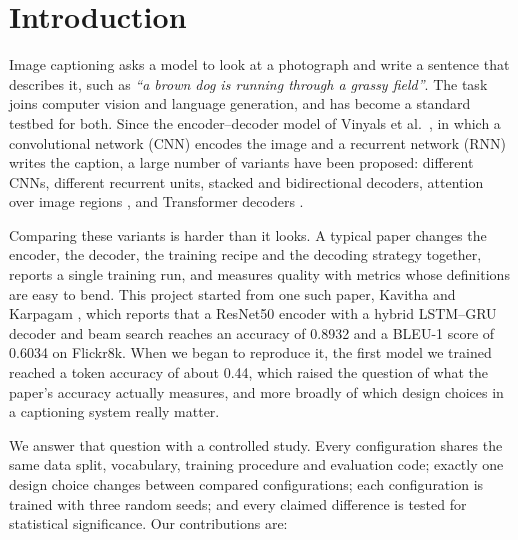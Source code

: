 \documentclass[11pt]{article}
\begin{document}
\section{Introduction}

Image captioning asks a model to look at a photograph and write a sentence that describes it, such as \textit{``a brown dog is running through a grassy field''}. The task joins computer vision and language generation, and has become a standard testbed for both. Since the encoder--decoder model of Vinyals et al.\ \cite{vinyals2015}, in which a convolutional network (CNN) encodes the image and a recurrent network (RNN) writes the caption, a large number of variants have been proposed: different CNNs, different recurrent units, stacked and bidirectional decoders, attention over image regions \cite{xu2015,anderson2018}, and Transformer decoders \cite{vaswani2017}.

Comparing these variants is harder than it looks. A typical paper changes the encoder, the decoder, the training recipe and the decoding strategy together, reports a single training run, and measures quality with metrics whose definitions are easy to bend. This project started from one such paper, Kavitha and Karpagam \cite{kavitha2025}, which reports that a ResNet50 encoder with a hybrid LSTM--GRU decoder and beam search reaches an accuracy of 0.8932 and a BLEU-1 score of 0.6034 on Flickr8k. When we began to reproduce it, the first model we trained reached a token accuracy of about 0.44, which raised the question of what the paper's accuracy actually measures, and more broadly of which design choices in a captioning system really matter.

We answer that question with a controlled study. Every configuration shares the same data split, vocabulary, training procedure and evaluation code; exactly one design choice changes between compared configurations; each configuration is trained with three random seeds; and every claimed difference is tested for statistical significance. Our contributions are:
\end{document}
